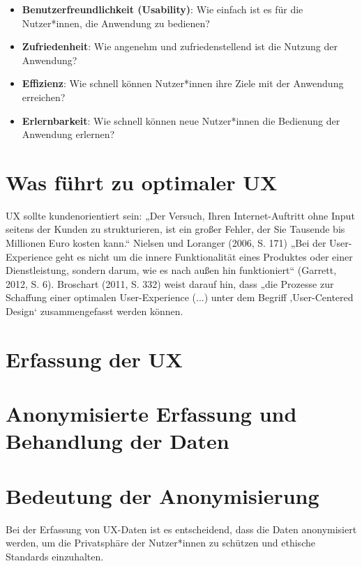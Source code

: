 \documentclass[12pt,oneside]{article}
\begin{document}
 

\begin{itemize}
\item \textbf{Benutzerfreundlichkeit (Usability)}: Wie einfach ist es für die Nutzer*innen, die Anwendung zu bedienen?
\item \textbf{Zufriedenheit}: Wie angenehm und zufriedenstellend ist die Nutzung der Anwendung?
\item \textbf{Effizienz}: Wie schnell können Nutzer*innen ihre Ziele mit der Anwendung erreichen?
\item \textbf{Erlernbarkeit}: Wie schnell können neue Nutzer*innen die Bedienung der Anwendung erlernen?
\end{itemize}
\section{Was führt zu optimaler UX}
UX sollte kundenorientiert sein: „Der Versuch, Ihren Internet-Auftritt ohne Input seitens der Kunden zu strukturieren, ist ein großer Fehler, der Sie Tausende bis Millionen Euro kosten kann.“ Nielsen und Loranger (2006, S. 171) „Bei der User-Experience geht es nicht um die innere Funktionalität eines Produktes oder einer Dienstleistung, sondern darum, wie es nach außen hin funktioniert“ (Garrett, 2012, S. 6). Broschart (2011, S. 332) weist darauf hin, dass „die Prozesse zur Schaffung einer optimalen User-Experience (...) unter dem Begriff ‚User-Centered Design‘ zusammengefasst werden können.
\section{Erfassung der UX}
\section{Anonymisierte Erfassung und Behandlung der Daten}
\section{Bedeutung der Anonymisierung}
Bei der Erfassung von UX-Daten ist es entscheidend, dass die Daten anonymisiert werden, um die Privatsphäre der Nutzer*innen zu schützen und ethische Standards einzuhalten.
\end{document}
